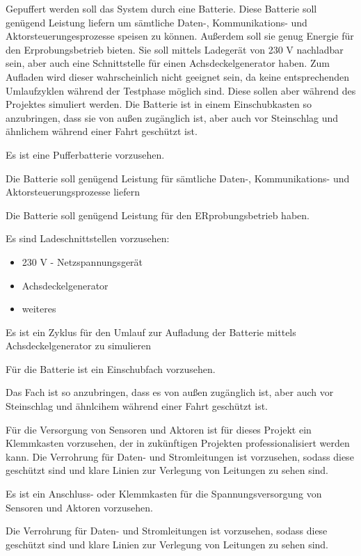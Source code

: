 Gepuffert werden soll das System durch eine Batterie. Diese Batterie soll genügend Leistung liefern um sämtliche Daten-, Kommunikations- und Aktorsteuerungesprozesse speisen zu können. Außerdem soll sie genug Energie für den Erprobungsbetrieb bieten. Sie soll mittels Ladegerät von 230 V nachladbar sein, aber auch eine Schnittstelle für einen Achsdeckelgenerator haben. Zum Aufladen wird dieser wahrscheinlich nicht geeignet sein, da keine entsprechenden Umlaufzyklen während der Testphase möglich sind. Diese sollen aber während des Projektes simuliert werden. Die Batterie ist in einem Einschubkasten so anzubringen, dass sie von außen zugänglich ist, aber auch vor Steinschlag und ähnlichem während einer Fahrt geschützt ist.\par
\begin{feat}
Es ist eine Pufferbatterie vorzusehen.
\end{feat}
\begin{rem}
Die Batterie soll genügend Leistung für sämtliche Daten-, Kommunikations- und Aktorsteuerungsprozesse liefern
\end{rem}
\begin{rem}
Die Batterie soll genügend Leistung für den ERprobungsbetrieb haben.
\end{rem}
\begin{rem}
Es sind Ladeschnittstellen vorzusehen:
\begin{itemize}
    \item 230 V - Netzspannungsgerät
    \item Achsdeckelgenerator
    \item weiteres
\end{itemize}
\end{rem}
\begin{feat}
Es ist ein Zyklus für den Umlauf zur Aufladung der Batterie mittels Achsdeckelgenerator zu simulieren
\end{feat}
\begin{feat}
Für die Batterie ist ein Einschubfach vorzusehen. 
\end{feat}
\begin{rem}
Das Fach ist so anzubringen, dass es von außen zugänglich ist, aber auch vor Steinschlag und ähnlcihem während einer Fahrt geschützt ist.
\end{rem}
Für die Versorgung von Sensoren und Aktoren ist für dieses Projekt ein Klemmkasten vorzusehen, der in zukünftigen Projekten professionalisiert werden kann. 
Die Verrohrung für Daten- und Stromleitungen ist vorzusehen, sodass diese geschützt sind und klare Linien zur Verlegung von Leitungen zu sehen sind. \par
\begin{feat}
Es ist ein Anschluss- oder Klemmkasten für die Spannungsversorgung von Sensoren und Aktoren vorzusehen. 
\end{feat}
\begin{feat}
Die Verrohrung für Daten- und Stromleitungen ist vorzusehen, sodass diese geschützt sind und klare Linien zur Verlegung von Leitungen zu sehen sind.
\end{feat}

